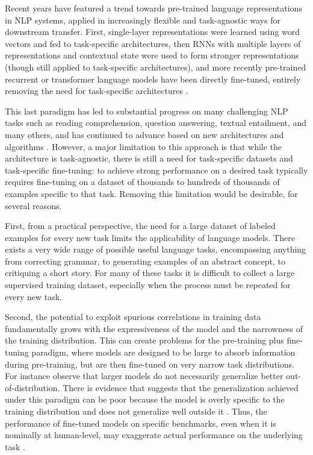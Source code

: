 Recent years have featured a trend towards pre-trained language representations in NLP systems, applied in increasingly flexible and task-agnostic ways for downstream transfer.  First, single-layer representations were learned using word vectors \cite{mikolov2013efficient, pennington2014glove} and fed to task-specific architectures, then RNNs with multiple layers of representations and contextual state were used to form stronger representations \cite{dai2015semi, mccann2017learned, peters2018dissecting} (though still applied to task-specific architectures), and more recently pre-trained recurrent or transformer language models \cite{vaswani2017attention}  have been directly fine-tuned, entirely removing the need for task-specific architectures \cite{radford2018gpt1, devlin2018bert, howard2018universal}.



This last paradigm has led to substantial progress on many challenging NLP tasks such as reading comprehension, question answering, textual entailment, and many others, and has continued to advance based on new architectures and algorithms \cite{raffel2019t5, liu2019roberta, yang2019xlnet, lan2019albert}. However, a major limitation to this approach is that while the architecture is task-agnostic, there is still a need for task-specific datasets and task-specific fine-tuning: to achieve strong performance on a desired task typically requires fine-tuning on a dataset of thousands to hundreds of thousands of examples specific to that task.  Removing this limitation would be desirable, for several reasons.

First, from a practical perspective, the need for a large dataset of labeled examples for every new task limits the applicability of language models.  There exists a very wide range of possible useful language tasks, encompassing anything from correcting grammar, to generating examples of an abstract concept, to critiquing a short story.  For many of these tasks it is difficult to collect a large supervised training dataset, especially when the process must be repeated for every new task.

Second, the potential to exploit spurious correlations in training data fundamentally grows with the expressiveness of the model and the narrowness of the training distribution. This can create problems for the pre-training plus fine-tuning paradigm, where models are designed to be large to absorb information during pre-training, but are then fine-tuned on very narrow task distributions. For instance \cite{hendrycks2020pretrained} observe that larger models do not necessarily generalize better out-of-distribution. There is evidence that suggests that the generalization achieved under this paradigm can be poor because the model is overly specific to the training distribution and does not generalize well outside it \cite{yogatama2019learning, mccoy2019right}. Thus, the performance of fine-tuned models on specific benchmarks, even when it is nominally at human-level, may exaggerate actual performance on the underlying task \cite{gururangan2018annotation, niven2019probing}.

